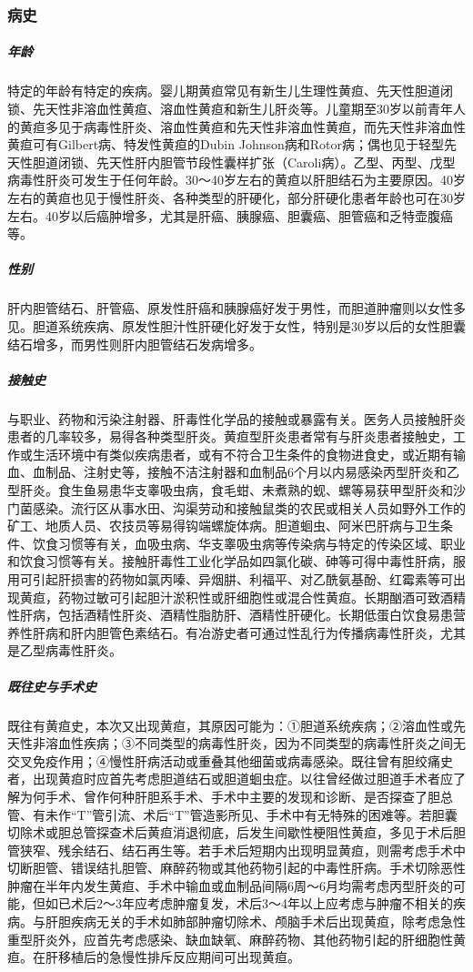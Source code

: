 \subsubsection{病史}

\subparagraph{年龄}

特定的年龄有特定的疾病。婴儿期黄疸常见有新生儿生理性黄疸、先天性胆道闭锁、先天性非溶血性黄疸、溶血性黄疸和新生儿肝炎等。儿童期至30岁以前青年人的黄疸多见于病毒性肝炎、溶血性黄疸和先天性非溶血性黄疸，而先天性非溶血性黄疸可有Gilbert病、特发性黄疸的Dubin
Johnson病和Rotor病；偶也见于轻型先天性胆道闭锁、先天性肝内胆管节段性囊样扩张（Caroli病）。乙型、丙型、戊型病毒性肝炎可发生于任何年龄。30～40岁左右的黄疸以肝胆结石为主要原因。40岁左右的黄疸也见于慢性肝炎、各种类型的肝硬化，部分肝硬化患者年龄也可在30岁左右。40岁以后癌肿增多，尤其是肝癌、胰腺癌、胆囊癌、胆管癌和乏特壶腹癌等。

\subparagraph{性别}

肝内胆管结石、肝管癌、原发性肝癌和胰腺癌好发于男性，而胆道肿瘤则以女性多见。胆道系统疾病、原发性胆汁性肝硬化好发于女性，特别是30岁以后的女性胆囊结石增多，而男性则肝内胆管结石发病增多。

\subparagraph{接触史}

与职业、药物和污染注射器、肝毒性化学品的接触或暴露有关。医务人员接触肝炎患者的几率较多，易得各种类型肝炎。黄疸型肝炎患者常有与肝炎患者接触史，工作或生活环境中有类似疾病患者，或有不符合卫生条件的食物进食史，或近期有输血、血制品、注射史等，接触不洁注射器和血制品6个月以内易感染丙型肝炎和乙型肝炎。食生鱼易患华支睾吸虫病，食毛蚶、未煮熟的蚬、螺等易获甲型肝炎和沙门菌感染。流行区从事水田、沟渠劳动和接触鼠类的农民或相关人员如野外工作的矿工、地质人员、农技员等易得钩端螺旋体病。胆道蛔虫、阿米巴肝病与卫生条件、饮食习惯等有关，血吸虫病、华支睾吸虫病等传染病与特定的传染区域、职业和饮食习惯等有关。接触肝毒性工业化学品如四氯化碳、砷等可得中毒性肝病，服用可引起肝损害的药物如氯丙嗪、异烟肼、利福平、对乙酰氨基酚、红霉素等可出现黄疸，药物过敏可引起胆汁淤积性或肝细胞性或混合性黄疸。长期酗酒可致酒精性肝病，包括酒精性肝炎、酒精性脂肪肝、酒精性肝硬化。长期低蛋白饮食易患营养性肝病和肝内胆管色素结石。有冶游史者可通过性乱行为传播病毒性肝炎，尤其是乙型病毒性肝炎。

\subparagraph{既往史与手术史}

既往有黄疸史，本次又出现黄疸，其原因可能为：①胆道系统疾病；②溶血性或先天性非溶血性疾病；③不同类型的病毒性肝炎，因为不同类型的病毒性肝炎之间无交叉免疫作用；④慢性肝病活动或重叠其他细菌或病毒感染。既往曾有胆绞痛史者，出现黄疸时应首先考虑胆道结石或胆道蛔虫症。以往曾经做过胆道手术者应了解为何手术、曾作何种肝胆系手术、手术中主要的发现和诊断、是否探查了胆总管、有未作“T”管引流、术后“T”管造影所见、手术中有无特殊的困难等。若胆囊切除术或胆总管探查术后黄疸消退彻底，后发生间歇性梗阻性黄疸，多见于术后胆管狭窄、残余结石、结石再生等。若手术后短期内出现明显黄疸，则需考虑手术中切断胆管、错误结扎胆管、麻醉药物或其他药物引起的中毒性肝病。手术切除恶性肿瘤在半年内发生黄疸、手术中输血或血制品间隔6周～6月均需考虑丙型肝炎的可能，但如已术后2～3年应考虑肿瘤复发，术后3～4年以上应考虑与肿瘤不相关的疾病。与肝胆疾病无关的手术如肺部肿瘤切除术、颅脑手术后出现黄疸，除考虑急性重型肝炎外，应首先考虑感染、缺血缺氧、麻醉药物、其他药物引起的肝细胞性黄疸。在肝移植后的急慢性排斥反应期间可出现黄疸。

